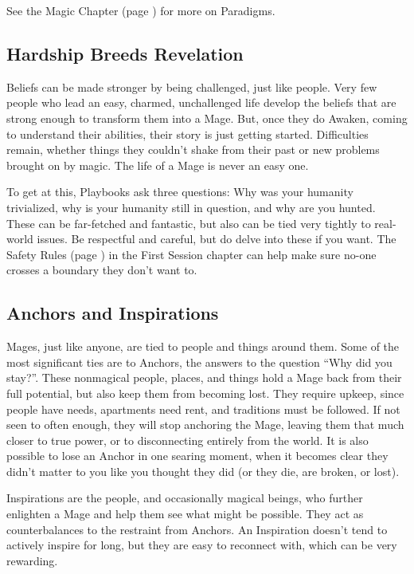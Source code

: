 \documentclass[
  oneside,
  statementpaper,
  9pt]{memoir}
\begin{document}
See the Magic Chapter (page \pageref{Magic Chapter}) for more on Paradigms.

\hypertarget{hardship-breeds-revelation}{%
\subsection{Hardship Breeds
Revelation}\label{hardship-breeds-revelation}}

Beliefs can be made stronger by being challenged, just like people. Very
few people who lead an easy, charmed, unchallenged life develop the
beliefs that are strong enough to transform them into a Mage. But, once
they do Awaken, coming to understand their abilities, their story is
just getting started. Difficulties remain, whether things they couldn't
shake from their past or new problems brought on by magic. The life of a
Mage is never an easy one.

To get at this, Playbooks ask three questions: Why was your humanity trivialized, why is your humanity still in question, and why are you hunted. These can be far-fetched and fantastic, but also can be tied very tightly to real-world issues. Be respectful and careful, but do delve into these if you want. The Safety Rules (page \pageref{Safety Rules}) in the First Session chapter can help make sure no-one crosses a boundary they don’t want to.

\hypertarget{anchors-and-inspirations}{%
\subsection{Anchors and Inspirations}\label{anchors-and-inspirations}}

Mages, just like anyone, are tied to people and things around them. Some
of the most significant ties are to Anchors, the answers to the question
``Why did you stay?''. These nonmagical people, places, and things hold
a Mage back from their full potential, but also keep them from becoming
lost. They require upkeep, since people have needs, apartments need
rent, and traditions must be followed. If not seen to often enough, they
will stop anchoring the Mage, leaving them that much closer to true
power, or to disconnecting entirely from the world. It is also possible
to lose an Anchor in one searing moment, when it becomes clear they
didn't matter to you like you thought they did (or they die, are broken,
or lost).

Inspirations are the people, and occasionally magical beings, who
further enlighten a Mage and help them see what might be possible. They
act as counterbalances to the restraint from Anchors. An Inspiration
doesn't tend to actively inspire for long, but they are easy to
reconnect with, which can be very rewarding.
\end{document}
